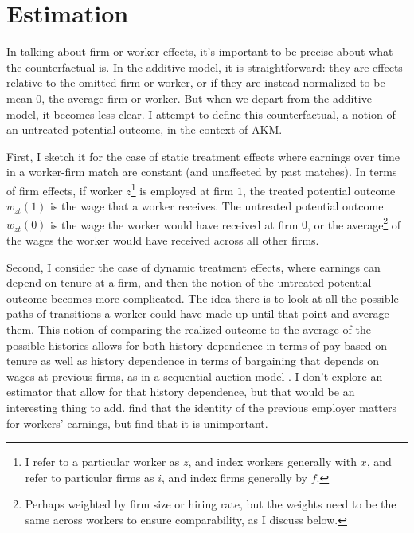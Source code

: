 \documentclass{article}
\begin{document}

\section{Estimation}

In talking about firm or worker effects, it's important to be precise about what the counterfactual is. In the additive model, it is straightforward: they are effects relative to the omitted firm or worker, or if they are instead normalized to be mean 0, the average firm or worker. But when we depart from the additive model, it becomes less clear. I attempt to define this counterfactual, a notion of an untreated potential outcome, in the context of AKM.

First, I sketch it for the case of static treatment effects where earnings over time in a worker-firm match are constant (and unaffected by past matches). In terms of firm effects, if worker $z$\footnote{I refer to a particular worker as $z$, and index workers generally with $x$, and refer to particular firms as $i$, and index firms generally by $f$.} is employed at firm $1$, the treated potential outcome $w_{zt}(1)$ is the wage that a worker receives. The untreated potential outcome $w_{zt}(0)$ is the wage the worker would have received at firm $0$, or the average\footnote{Perhaps weighted by firm size or hiring rate, but the weights need to be the same across workers to ensure comparability, as I discuss below.} of the wages the worker would have received across all other firms.

Second, I consider the case of dynamic treatment effects, where earnings can depend on tenure at a firm, and then the notion of the untreated potential outcome becomes more complicated. The idea there is to look at all the possible paths of transitions a worker could have made up until that point and average them. This notion of comparing the realized outcome to the average of the possible histories allows for both history dependence in terms of pay based on tenure as well as history dependence in terms of bargaining that depends on wages at previous firms, as in a sequential auction model \citep{postel2002equilibrium}. I don't explore an estimator that allow for that history dependence, but that would be an interesting thing to add. \citet{bonhomme2019distributional} find that the identity of the previous employer matters for workers' earnings, but \citet{di2021ain} find that it is unimportant.
\end{document}
